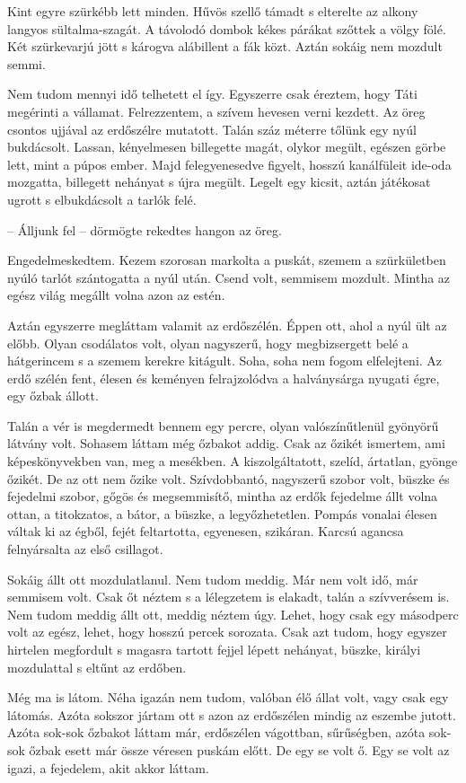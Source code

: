 \documentclass{IEEEtran}
\begin{document}
Kint egyre szürkébb lett minden. Hűvös szellő támadt s elterelte az alkony langyos sültalma-szagát. A távolodó dombok kékes párákat szőttek a völgy fölé. Két szürkevarjú jött s károgva alábillent a fák közt. Aztán sokáig nem mozdult semmi.

Nem tudom mennyi idő telhetett el így. Egyszerre csak éreztem, hogy Táti megérinti a vállamat. Felrezzentem, a szívem hevesen verni kezdett. Az öreg csontos ujjával az erdőszélre mutatott. Talán száz méterre tőlünk egy nyúl bukdácsolt. Lassan, kényelmesen billegette magát, olykor megült, egészen görbe lett, mint a púpos ember. Majd felegyenesedve figyelt, hosszú kanálfüleit ide-oda mozgatta, billegett nehányat s újra megült. Legelt egy kicsit, aztán játékosat ugrott s elbukdácsolt a tarlók felé.

– Álljunk fel – dörmögte rekedtes hangon az öreg.

Engedelmeskedtem. Kezem szorosan markolta a puskát, szemem a szürkületben nyúló tarlót szántogatta a nyúl után. Csend volt, semmisem mozdult. Mintha az egész világ megállt volna azon az estén.

Aztán egyszerre megláttam valamit az erdőszélén. Éppen ott, ahol a nyúl ült az előbb. Olyan csodálatos volt, olyan nagyszerű, hogy megbizsergett belé a hátgerincem s a szemem kerekre kitágult. Soha, soha nem fogom elfelejteni. Az erdő szélén fent, élesen és keményen felrajzolódva a halványsárga nyugati égre, egy őzbak állott.

Talán a vér is megdermedt bennem egy percre, olyan valószínűtlenül gyönyörű látvány volt. Sohasem láttam még őzbakot addig. Csak az őzikét ismertem, ami képeskönyvekben van, meg a mesékben. A kiszolgáltatott, szelíd, ártatlan, gyönge őzikét. De az ott nem őzike volt. Szívdobbantó, nagyszerű szobor volt, büszke és fejedelmi szobor, gőgös és megsemmisítő, mintha az erdők fejedelme állt volna ottan, a titokzatos, a bátor, a büszke, a legyőzhetetlen. Pompás vonalai élesen váltak ki az égből, fejét feltartotta, egyenesen, szikáran. Karcsú agancsa felnyársalta az első csillagot.

Sokáig állt ott mozdulatlanul. Nem tudom meddig. Már nem volt idő, már semmisem volt. Csak őt néztem s a lélegzetem is elakadt, talán a szívverésem is. Nem tudom meddig állt ott, meddig néztem úgy. Lehet, hogy csak egy másodperc volt az egész, lehet, hogy hosszú percek sorozata. Csak azt tudom, hogy egyszer hirtelen megfordult s magasra tartott fejjel lépett nehányat, büszke, királyi mozdulattal s eltűnt az erdőben.

Még ma is látom. Néha igazán nem tudom, valóban élő állat volt, vagy csak egy látomás. Azóta sokszor jártam ott s azon az erdőszélen mindig az eszembe jutott. Azóta sok-sok őzbakot láttam már, erdőszélen vágottban, sűrűségben, azóta sok-sok őzbak esett már össze véresen puskám előtt. De egy se volt ő. Egy se volt az igazi, a fejedelem, akit akkor láttam.
\end{document}
